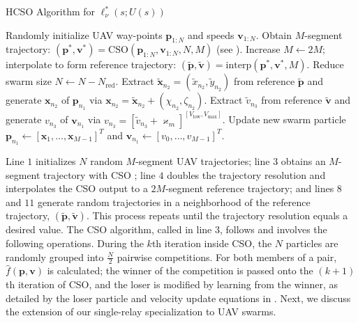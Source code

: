 \documentclass[12pt, draftcls, onecolumn]{IEEEtran}
\theoremstyle{plain}
\theoremstyle{definition}
\theoremstyle{remark}
\begin{document}
\begin{algorithm}[t]
\caption{HCSO Algorithm for $\ell_{\nu}^* (s; U(s))$}\label{A3}
    \begin{algorithmic}[1]
        \scriptsize
    	\State Randomly initialize UAV way-points $\mathbf p_{1:N}$ and speeds  $\mathbf v_{1:N}$.
    		\State Obtain $M$-segment trajectory: $(\mathbf p^*, \mathbf v^*) = \mathrm{CSO}(\mathbf p_{1:N}, \mathbf v_{1:N},N,M)$ (see \cite{CSO}).
    		\State Increase $M \gets 2M$; interpolate to form reference trajectory: $(\tilde{\mathbf p}, \tilde{\mathbf v}) = \mathrm{interp}(\mathbf p^*, \mathbf v^*, M)$.
    		\State Reduce swarm size $N \gets N - N_{\mathrm{red}}$.
    				\State Extract $\tilde{\mathbf x}_{n_2} = (\tilde{x}_{n_2},\tilde{y}_{n_2})$ from reference $\tilde{\mathbf p}$ and generate $\mathbf x_{n_2}$ of $\mathbf p_{n_1}$ via $\mathbf{x}_{n_2}{=}\tilde{\mathbf{x}}_{n_2}{+}(\chi_{n_2},\zeta_{n_2})$.
    			\EndFor
    				\State Extract $\tilde v_{n_3}$ from reference $\tilde{\mathbf v}$ and generate $v_{n_3}$ of $\mathbf v_{n_1}$ via $v_{n_3}{=}[\tilde{v}_{n_3}{+}\varkappa_m]^{[V_{\mathrm{low}},V_{\mathrm{max}}]}$.
    			\EndFor
    			\State Update new swarm particle $\mathbf p_{n_1} \gets [\mathbf x_{1},\dots,\mathbf x_{M-1}]^T$ and $\mathbf v_{n_1} \gets [v_0, \dots, v_{M-1}]^T$.
    		\EndFor
    	\EndWhile
    \end{algorithmic}
\end{algorithm}

Line $1$ initializes $N$ random $M$-segment UAV trajectories; line $3$ obtains an $M$-segment trajectory with CSO \cite{CSO}; line $4$ doubles the trajectory resolution and interpolates the CSO output to a $2M$-segment reference trajectory; and lines $8$ and $11$ generate random trajectories in a neighborhood of the reference trajectory, $(\tilde{\mathbf p}, \tilde{\mathbf v})$. This process repeats until the trajectory resolution equals a desired value. The CSO algorithm, called in line $3$, follows \cite{CSO} and involves the following operations. During the $k$th iteration inside CSO, the $N$ particles are randomly grouped into $\frac{N}{2}$ pairwise competitions. For both members of a pair, $\hat{f}(\mathbf{p},\mathbf{v})$ is calculated; the winner of the competition is passed onto the $(k{+}1)$th iteration of CSO, and the loser is modified by learning from the winner, as detailed by the loser particle and velocity update equations in \cite{CSO}. Next, we discuss the extension of our single-relay specialization to UAV swarms.
\vspace{-4mm}
\end{document}
